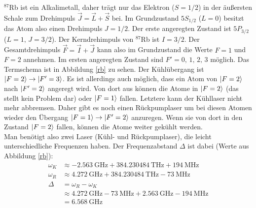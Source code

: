 \documentclass[12pt, a4paper]{article}
\begin{document}
${}^{87}$Rb ist ein Alkalimetall, daher trägt nur das Elektron ($S=1/2$) in der äußersten Schale zum Drehimpuls $\vec{J}=\vec{L}+\vec{S}$ bei. Im Grundzustand $5S_{1/2}$ ($L=0$) besitzt das Atom also einen Drehimpuls $J = 1/2$. Der erste angeregten Zustand ist $5P_{3/2}$ ($L=1,\, J=3/2$). Der Kerndrehimpuls von ${}^{87}$Rb ist $I=3/2$. Der Gesamtdrehimpuls $\vec{F}=\vec{I}+\vec{J}$ kann also im Grundzustand die Werte $F = 1$ und $F = 2$ annehmen. Im ersten angeregten Zustand sind $F'= 0,\, 1,\, 2,\, 3$ möglich. Das Termschema ist in Abbildung \ref{rb} zu sehen.
   Der Kühlübergang ist $\ket{F=2}\rightarrow\ket{F'=3}$. Es ist allerdings auch möglich, dass ein Atom von $\ket{F=2}$ nach $\ket{F'=2}$ angeregt wird. Von dort aus können die Atome in $\ket{F=2}$ (das stellt kein Problem dar) oder $\ket{F=1}$ fallen. Letztere kann der Kühllaser nicht mehr abbremsen. Daher gibt es noch einen Rückpumplaser um bei diesen Atomen wieder den Übergang $\ket{F=1}\rightarrow\ket{F'=2}$ anzuregen. Wenn sie von dort in den Zustand $\ket{F=2}$ fallen, können die Atome weiter gekühlt werden.
   \\Man benötigt also zwei Laser (Kühl- und Rückpumplaser), die leicht unterschiedliche Frequenzen haben. Der Frequenzabstand $\Delta$ ist dabei (Werte aus Abbildung \ref{rb}):
   \begin{align*}
     \omega_K & \approx - \SI{2,563}{\GHz} + \SI{384,230484}{\THz} + \SI{194}{\MHz} \\
     \omega_R & \approx \SI{4,272}{\GHz} + \SI{384,230484}{\THz} - \SI{73}{\MHz} \\
     \Delta & = \omega_R - \omega_K \\
     & \approx \SI{4,272}{\GHz} - \SI{73}{\MHz} + \SI{2,563}{\GHz} - \SI{194}{\MHz} \\
     & = \SI{6,568}{\GHz}
   \end{align*}
\newpage
\end{document}
